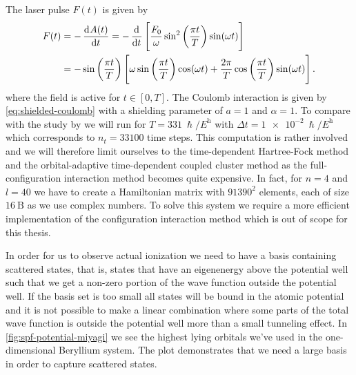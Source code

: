         The laser pulse $F(t)$ is given by \cite{miyagi_and_madsen}
        \begin{align}
            F(t)
            &= -\dod[]{A(t)}{t}
            = -\dod[]{}{t}\brak{
                \frac{F_0}{\omega}
                \sin^2\para{\frac{\pi t}{T}}
                \sin(\omega t)
            }
            \\
            &=
            -\sin\para{\frac{\pi t}{T}}\brak{
                \omega \sin\para{\frac{\pi t}{T}}
                \cos(\omega t)
                + \frac{2\pi}{T}
                \cos\para{\frac{\pi t}{T}}
                \sin(\omega t)
            }.
            \label{eq:miyagi-laser}
        \end{align}
        where the field is active for $t \in [0, T]$.
        The Coulomb interaction is given by \autoref{eq:shielded-coulomb} with a
        shielding parameter of $a = 1$ and $\alpha = 1$.
        To compare with the study by \citeauthor{miyagi_and_madsen} we will run
        for $T = \SI{331}{\hslash/\hartree}$ with $\Delta t =
        \SI{1e-2}{\hslash/\hartree}$ which corresponds to $n_t = 33100$
        time steps.
        This computation is rather involved and we will therefore limit
        ourselves to the time-dependent Hartree-Fock method and the
        orbital-adaptive time-dependent coupled cluster method as the
        full-configuration interaction method becomes quite expensive.
        In fact, for $n = 4$ and $l = 40$ we have to create a Hamiltonian
        matrix with $91390^2$ elements, each of size $\SI{16}{\text{B}}$ as
        we use complex numbers.
        To solve this system we require a more efficient implementation of the
        configuration interaction method which is out of scope for this thesis.


        In order for us to observe actual ionization we need to have a basis
        containing scattered states, that is, states that have an eigenenergy
        above the potential well such that we get a non-zero portion of the wave
        function outside the potential well.
        If the basis set is too small all states will be bound in the atomic
        potential and it is not possible to make a linear combination where
        some parts of the total wave function is outside the potential well
        more than a small tunneling effect.
        In \autoref{fig:spf-potential-miyagi} we see the highest lying
        orbitals we've used in the one-dimensional Beryllium system.
        The plot demonstrates that we need a large basis in order to capture
        scattered states.

